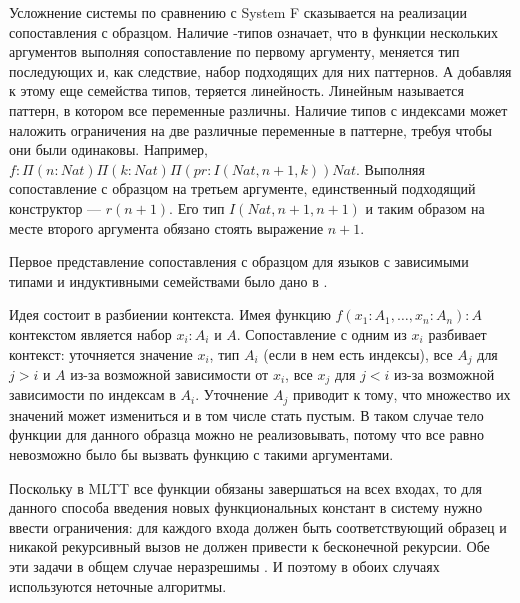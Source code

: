 Усложнение системы по сравнению с System F сказывается на реализации сопоставления
с образцом. Наличие \textPi-типов означает, что в функции нескольких аргументов
выполняя сопоставление по первому аргументу, меняется тип последующих и, как
следствие, набор подходящих для них паттернов. А добавляя к этому еще семейства
типов, теряется линейность. Линейным называется паттерн, в котором все переменные
различны. Наличие типов с индексами может наложить ограничения
на две различные переменные в паттерне, требуя чтобы они были одинаковы. Например,
\(f : \Pi(n : Nat) \Pi(k : Nat) \Pi(pr : I(Nat, n + 1, k)) Nat\). Выполняя
сопоставление с образцом на третьем аргументе, единственный подходящий конструктор
--- \(r(n + 1)\). Его тип \(I(Nat, n + 1, n + 1)\) и таким образом на месте второго
аргумента обязано стоять выражение \(n + 1\).

Первое представление сопоставления с образцом для языков с зависимыми типами и
индуктивными семействами было дано в \cite{dependent-pattern-matching}.

Идея состоит в разбиении контекста. Имея функцию \(f(x_1 : A_1, \dots, x_n : A_n) : A\)
контекстом является набор \(x_i : A_i\) и \(A\). Сопоставление с одним из \(x_i\)
разбивает контекст: уточняется значение \(x_i\), тип \(A_i\) (если в нем есть
индексы), все \(A_j\) для \(j > i\) и \(A\) из-за возможной зависимости от \(x_i\),
все \(x_j\) для \(j < i\) из-за возможной зависимости по индексам в \(A_i\).
Уточнение \(A_j\) приводит к тому, что множество их значений может измениться
и в том числе стать пустым. В таком случае тело функции для данного образца
можно не реализовывать, потому что все равно невозможно было бы вызвать функцию
с такими аргументами.

Поскольку в MLTT все функции обязаны завершаться на всех входах, то для
данного способа введения новых функциональных констант в систему нужно ввести
ограничения: для каждого входа должен быть соответствующий образец и никакой
рекурсивный вызов не должен привести к бесконечной рекурсии. Обе эти задачи
в общем случае неразрешимы \cite{eliminating-dependent-pattern-matching}. И
поэтому в обоих случаях используются неточные алгоритмы.
